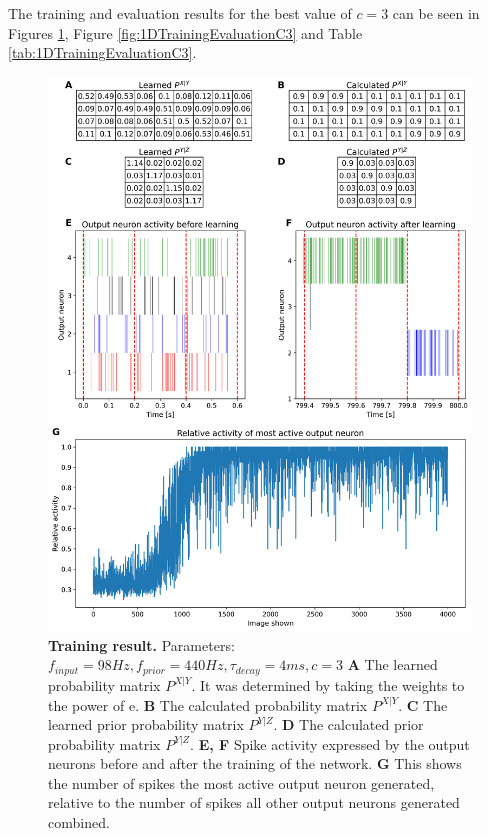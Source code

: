 The training and evaluation results for the best value of $c = 3$ can be seen in Figures \ref{fig:1DTrainingC3}, Figure \ref{fig:1DTrainingEvaluationC3} and Table \ref{tab:1DTrainingEvaluationC3}.
\begin{figure}
  \includegraphics[width=\linewidth]{figures/1D/training/trainingPlot_98_440_4_c3.png}
  \caption{\textbf{Training result.} Parameters: $f_{input} = 98 Hz, f_{prior} = 440 Hz, \tau_{decay} = 4 ms, c = 3$  \textbf{A} The learned probability matrix $P^{X|Y}$. It was determined by taking the weights to the power of e. \textbf{B} The calculated probability matrix $P^{X|Y}$. \textbf{C} The learned prior probability matrix $P^{Y|Z}$. \textbf{D} The calculated prior probability matrix $P^{Y|Z}$.
 \textbf{E, F} Spike activity expressed by the output neurons before and after the training of the network. \textbf{G} This shows the number of spikes the most active output neuron generated, relative to the number of spikes all other output neurons generated combined.}
  \label{fig:1DTrainingC3}
\end{figure}

